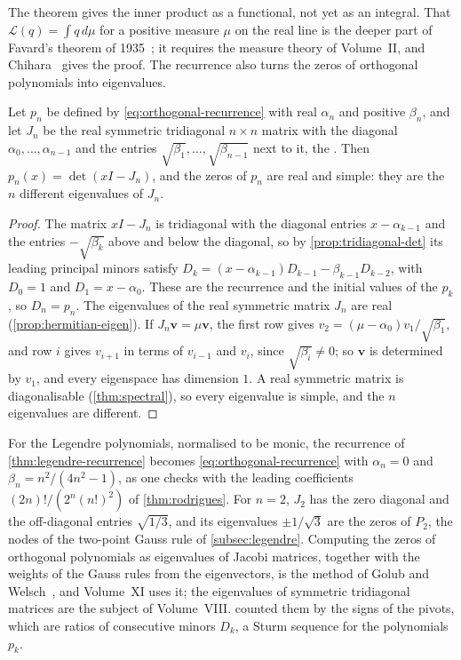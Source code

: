 The theorem gives the inner product as a functional, not yet as an integral. That $\mathcal L(q)=\int q\,d\mu$ for a positive measure $\mu$ on the real line is the deeper part of Favard's theorem of 1935~\cite{favard1935}; it requires the measure theory of Volume~II, and Chihara~\cite[Chaps.~I and~II]{chihara1978} gives the proof. The recurrence also turns the zeros of orthogonal polynomials into eigenvalues.

\begin{proposition}
\label{prop:jacobi-matrix}
Let $p_n$ be defined by \eqref{eq:orthogonal-recurrence} with real $\alpha_n$ and positive $\beta_n$, and let $J_n$ be the real symmetric tridiagonal $n\times n$ matrix with the diagonal $\alpha_0,\ldots,\alpha_{n-1}$ and the entries $\sqrt{\beta_1},\ldots,\sqrt{\beta_{n-1}}$ next to it, the . Then $p_n(x)=\det(xI-J_n)$, and the zeros of $p_n$ are real and simple: they are the $n$ different eigenvalues of $J_n$.
\end{proposition}

\begin{proof}
The matrix $xI-J_n$ is tridiagonal with the diagonal entries $x-\alpha_{k-1}$ and the entries $-\sqrt{\beta_k}$ above and below the diagonal, so by \cref{prop:tridiagonal-det} its leading principal minors satisfy $D_k=(x-\alpha_{k-1})D_{k-1}-\beta_{k-1}D_{k-2}$, with $D_0=1$ and $D_1=x-\alpha_0$. These are the recurrence and the initial values of the $p_k$, so $D_n=p_n$. The eigenvalues of the real symmetric matrix $J_n$ are real (\cref{prop:hermitian-eigen}). If $J_n\mathbf v=\mu\mathbf v$, the first row gives $v_2=(\mu-\alpha_0)v_1/\sqrt{\beta_1}$, and row $i$ gives $v_{i+1}$ in terms of $v_{i-1}$ and $v_i$, since $\sqrt{\beta_i}\ne0$; so $\mathbf v$ is determined by $v_1$, and every eigenspace has dimension $1$. A real symmetric matrix is diagonalisable (\cref{thm:spectral}), so every eigenvalue is simple, and the $n$ eigenvalues are different.
\end{proof}

For the Legendre polynomials, normalised to be monic, the recurrence of \cref{thm:legendre-recurrence} becomes \eqref{eq:orthogonal-recurrence} with $\alpha_n=0$ and $\beta_n=n^2/(4n^2-1)$, as one checks with the leading coefficients $(2n)!/(2^n(n!)^2)$ of \cref{thm:rodrigues}. For $n=2$, $J_2$ has the zero diagonal and the off-diagonal entries $\sqrt{1/3}$, and its eigenvalues $\pm1/\sqrt3$ are the zeros of $P_2$, the nodes of the two-point Gauss rule of \cref{subsec:legendre}. Computing the zeros of orthogonal polynomials as eigenvalues of Jacobi matrices, together with the weights of the Gauss rules from the eigenvectors, is the method of Golub and Welsch~\cite{golubwelsch1969}, and Volume~XI uses it; the eigenvalues of symmetric tridiagonal matrices are the subject of Volume~VIII.  counted them by the signs of the pivots, which are ratios of consecutive minors $D_k$, a Sturm sequence for the polynomials $p_k$.

